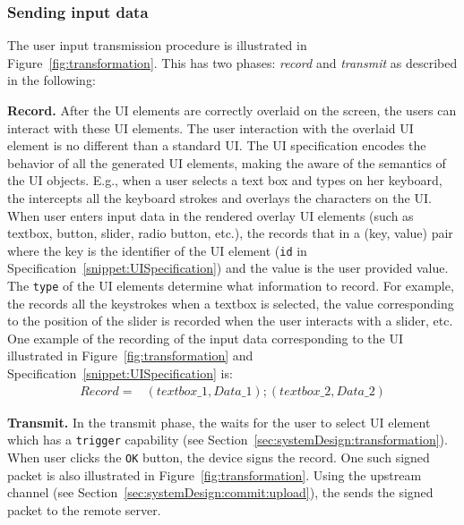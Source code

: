 \subsubsection{\bfseries Sending input data}\label{sec:systemDesign:commit:send}
The user input transmission procedure is illustrated in Figure~\ref{fig:transformation}. This has two phases: \emph{record} and \emph{transmit} as described in the following:

\begin{mylist}
\item \textbf{Record.} After the UI elements are correctly overlaid on the screen, the users can interact with these UI elements. The user interaction with the overlaid UI element is no different than a standard UI. The UI specification encodes the behavior of all the generated UI elements, making the \device aware of the semantics of the UI objects. E.g., when a user selects a text box and types on her keyboard, the \device intercepts all the keyboard strokes and overlays the characters on the UI.
When user enters input data in the rendered overlay UI elements (such as textbox, button, slider, radio button, etc.), the \device records that in a (key, value) pair where the key is the identifier of the UI element (\texttt{id} in Specification~\ref{snippet:UISpecification}) and the value is the user provided value. The \texttt{type} of the UI elements determine what information to record. For example, the \device records all the keystrokes when a textbox is selected, the value corresponding to the position of the slider is recorded when the user interacts with a slider, etc. One example of the recording of the input data corresponding to the UI illustrated in Figure~\ref{fig:transformation} and Specification~\ref{snippet:UISpecification} is: 
\begin{align*}
Record = & (textbox\_1, Data\_1);(textbox\_2,Data\_2)
\end{align*}

\item \textbf{Transmit.} In the transmit phase, the \device waits for the user to select UI element which has a \texttt{trigger} capability (see Section~\ref{sec:systemDesign:transformation}).  When user clicks the \texttt{OK} button, the device signs the record. One such signed packet is also illustrated in Figure~\ref{fig:transformation}. Using the upstream channel (see Section~\ref{sec:systemDesign:commit:upload}), the \device sends the signed packet to the remote server.
\end{mylist} 

